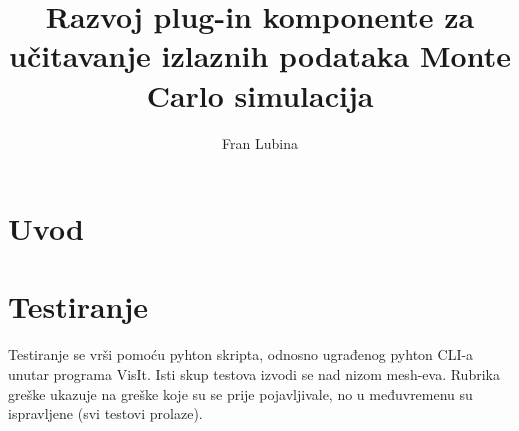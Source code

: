 \documentclass[times, utf8, zavrsni]{fer}
\begin{document}

\title{Razvoj plug-in komponente za učitavanje izlaznih podataka Monte Carlo simulacija}


\author{Fran Lubina}

\maketitle

\izvornik


\tableofcontents

\chapter{Uvod}

\chapter{Testiranje}
Testiranje se vrši pomoću pyhton skripta, odnosno ugrađenog pyhton CLI-a unutar programa VisIt.
Isti skup testova izvodi se nad nizom mesh-eva.
Rubrika greške ukazuje na greške koje su se prije pojavljivale, no u međuvremenu su ispravljene (svi testovi prolaze).
	
\end{document}
